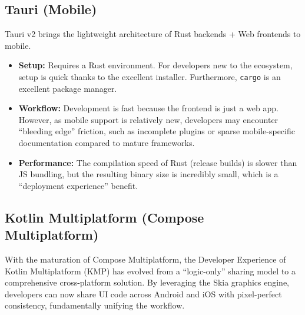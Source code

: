 \subsection{Tauri (Mobile)}
Tauri v2 brings the lightweight architecture of Rust backends + Web frontends to mobile.
\begin{itemize}
    \item \textbf{Setup:} Requires a Rust environment. For developers new to the ecosystem, setup is quick thanks to the excellent installer. Furthermore, \texttt{cargo} is an excellent package manager.~\cite{DX:TAU:01}
    \item \textbf{Workflow:} Development is fast because the frontend is just a web app. However, as mobile support is relatively new, developers may encounter ``bleeding edge'' friction, such as incomplete plugins or sparse mobile-specific documentation compared to mature frameworks.
    \item \textbf{Performance:} The compilation speed of Rust (release builds) is slower than JS bundling, but the resulting binary size is incredibly small, which is a ``deployment experience'' benefit.
\end{itemize}

\subsection{Kotlin Multiplatform (Compose Multiplatform)}\label{subsec:kmp_compose}

With the maturation of Compose Multiplatform, the Developer Experience of Kotlin Multiplatform (KMP) has evolved from a ``logic-only'' sharing model to a comprehensive cross-platform solution. By leveraging the Skia graphics engine, developers can now share UI code across Android and iOS with pixel-perfect consistency, fundamentally unifying the workflow.~\cite{DX:KMM:01}

